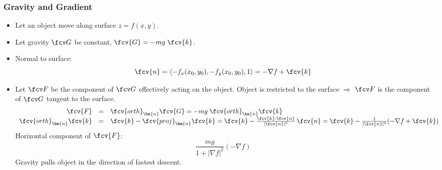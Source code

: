 \begin{frame}
\frametitle{Gravity and Gradient}
\begin{itemize}
\item Let an object move along surface $z=f(x,y)$.
\item Let gravity $\fcv G$ be constant, $\fcv{G}= -mg\; \fcv{k}$. 
\item  Normal to surface:
$$\fcv{n} = \langle -f_x(x_0,y_0), -f_y(x_0,y_0), 1\rangle = -\nabla f + \fcv{k}$$
\item Let $\fcv F$ be the component of $\fcv G$ effectively acting on the object. Object is restricted to the surface $\Rightarrow$ $\fcv F$ is the component of $\fcv G$ tangent to the surface.
\[\begin{array}{rcl}
\fcv{F} &=& \fcv{orth}_{\bm{n}} \fcv{G} = -mg \; \fcv{orth}_{\bm{n}} \fcv{k}\\
\fcv{orth}_{\bm{n}} \fcv{k} &=& \fcv{k} - \fcv{proj}_{\bm{n}} \fcv{k} = \fcv{k} - \frac{\fcv{k}\cdot \fcv{n}}{|\fcv{n}|^2} \, \fcv{n} = \fcv{k} - \frac{1}{|\fcv{n}|^2} (-\nabla f + \fcv{k})
\end{array}  
\]
\pause
Horizontal component of $\fcv{F}$:
%
$$\frac{mg}{1+|\nabla f|^2} (-\nabla f)$$
\pause
Gravity pulls object in the direction of fastest descent.

\end{itemize}
\end{frame}
